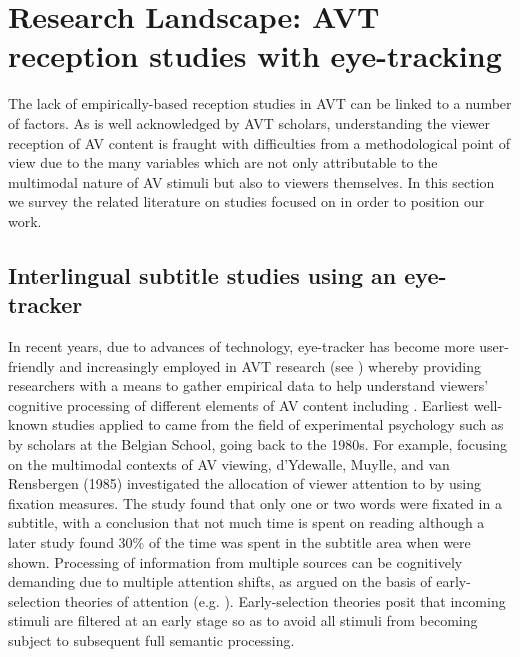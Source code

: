 \documentclass[output=paper]{langsci/langscibook}
\begin{document}
\section{Research Landscape: AVT reception studies with eye-tracking}

The lack of empirically-based reception studies in AVT can be linked to a number of factors. As is well acknowledged by AVT scholars, understanding the viewer reception of AV content is fraught with difficulties from a methodological point of view due to the many variables which are not only attributable to the multimodal nature of AV stimuli but also to viewers themselves.  In this section we survey the related literature on  studies focused on  in order to position our work.    

\subsection{Interlingual subtitle studies using an eye-tracker}

In recent years, due to advances of technology, eye-tracker has become more user-friendly and increasingly employed in AVT research (see \citealt{perego2012}) whereby providing researchers with a means to gather empirical data to help understand viewers' cognitive processing of different elements of AV content including . Earliest well-known  studies applied to  came from the field of experimental psychology such as by scholars at the Belgian School, going back to the 1980s. For example, focusing on the multimodal contexts of AV viewing, d'Ydewalle, Muylle, and van Rensbergen (1985) investigated the allocation of viewer attention to  by using fixation measures. The study found that only one or two words were fixated in a subtitle, with a conclusion that not much time is spent on reading  although a later study \citep{dydewalle1987} found 30\% of the time was spent in the subtitle area when  were shown. Processing of information from multiple sources can be cognitively demanding due to multiple attention shifts, as argued on the basis of early-selection theories of attention (e.g. \citealt{Treisman1968}). Early-selection theories posit that incoming stimuli are filtered at an early stage so as to avoid all stimuli from becoming subject to subsequent full semantic processing.  
\end{document}
